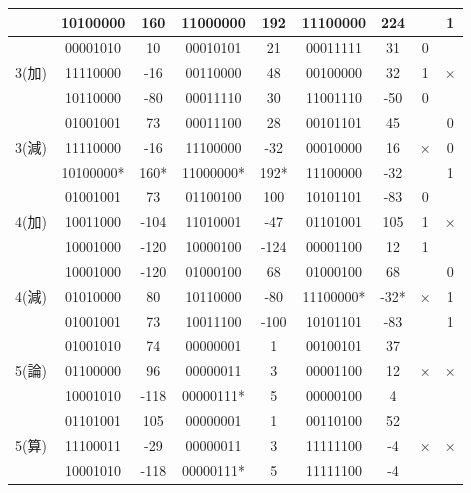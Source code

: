 \documentclass[11pt,a4j]{jsarticle}
\begin{document}
\begin{table}[htb]
\begin{center}
\begin{tabular}{|c|c|c|c|c|c|c|c|c|}
 & 10100000 & 160 &11000000  & 192 & 11100000 &224  &  & 1 \\ \hline
 &00001010  & 10 & 00010101 &21  & 00011111 &31  & 0 &  \\ \cline{2-8}
3(加) & 11110000 &-16  & 00110000 & 48 & 00100000 & 32 & 1 & × \\ \cline{2-8}
 & 10110000 & -80 &00011110  & 30 & 11001110 &-50  & 0 &  \\ \hline
 & 01001001 & 73 & 00011100 &28  & 00101101 &45  &  & 0 \\ \cline{2-7}\cline{9-9}
3(減) & 11110000 & -16 &11100000  & -32 &00010000  &16  & × & 0 \\ \cline{2-7}\cline{9-9}
 & 10100000* & 160* & 11000000* & 192* &11100000  &-32  &  & 1 \\ \hline
 &01001001  & 73 &01100100  & 100 & 10101101 & -83 & 0 &  \\ \cline{2-8}
4(加) &  10011000& -104 & 11010001 & -47 & 01101001 &105  & 1 & × \\ \cline{2-8}
 &  10001000&-120  &  10000100& -124 &00001100  & 12 & 1 &  \\ \hline
 &10001000  & -120 & 01000100 & 68 &01000100  & 68 &  & 0 \\ \cline{2-7}\cline{9-9}
4(減) &01010000  & 80 & 10110000 & -80 & 11100000* & -32* & × & 1 \\ \cline{2-7}\cline{9-9}
 &01001001  &73  & 10011100 & -100 &10101101  &-83  &  & 1 \\ \hline
 & 01001010 &74  &00000001  &1  &00100101  & 37 &  &  \\ \cline{2-7}
5(論) &01100000  & 96 & 00000011 & 3 &00001100  &12  & × & × \\ \cline{2-7}
 & 10001010 &-118  & 00000111* &5  & 00000100 &4  &  &  \\ \hline
 &01101001  &105  &00000001  & 1 &00110100  &52  &  &  \\ \cline{2-7}
5(算) & 11100011 & -29 & 00000011 &3  &11111100  &-4  & × & × \\ \cline{2-7}
 & 10001010 & -118 &00000111*  & 5 & 11111100 &-4  &  &  \\ \hline
    \end{tabular}
    \label{tab:1junbi}
  \end{center}
 \end{table}
  
  
  
  
  
\end{document}
